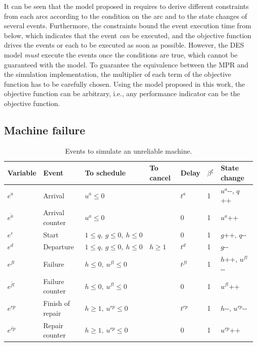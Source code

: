 \documentclass[]{interact}
\theoremstyle{plain}%
\theoremstyle{definition}
\theoremstyle{remark}
\begin{document}
It can be seen that the model proposed in \cite{chan2008optimization} requires to derive different constraints from each arcs according to the condition on the arc and to the state changes of several events. Furthermore, the constraints bound the event execution time from below, which indicates that the event \textit{can} be executed, and the objective function drives the events or each to be executed as soon as possible. However, the DES model \textit{must} execute the events once the conditions are true, which cannot be guaranteed with the model. To guarantee the equivalence between the MPR  and the simulation implementation, the multiplier of each term of the objective function has to be carefully chosen. Using the model proposed in this work, the objective function can be arbitrary, i.e., any performance indicator can be the objective function.

\subsection{Machine failure}
\begin{table}[h]
	\begin{tabular}{|lllllll|}\hline
		Variable&Event & To schedule & To cancel &Delay&$\beta^{\xi}$& State change\\\hline
		$e^{a}$&Arrival&$u^a\le 0$&&$t^{a}$&1&$u^a${\small-}{\small-},  $q${\footnotesize++}\\\hline
		$e^{\tilde{a}}$ & Arrival counter&$u^a\le 0$&&0&1& $u^a${\footnotesize++} \\\hline
		$e^{r}$&Start&$1\le q,\ g\le 0,\ h\le 0$&&0&1&$g${\footnotesize++}, $q${\small-}{\small-}\\\hline
		$e^{d}$&Departure&$1\le q,\ g\le 0,\ h\le 0$&$h\ge 1$&$t^{d}$&1&$g${\small-}{\small-}\\\hline
		$e^{fl}$&Failure& $h\le 0,\ u^{fl}\le 0$&&$t^{fl}$&1&$h${\footnotesize++}, $u^{fl}${\small-}{\small-} \\\hline
		$e^{\tilde{fl}}$&Failure counter& $h\le 0,\ u^{fl}\le 0$&&0&1&$u^{fl}${\footnotesize++} \\\hline
		$e^{rp}$&Finish of repair& $h\ge 1,\ u^{rp}\le 0$&&$t^{rp}$&1&$h${\small-}{\small-}, $u^{rp}${\small-}{\small-}\\\hline
		$e^{\tilde{rp}}$&Repair counter& $h\ge 1,\ u^{rp}\le 0$&&0&1&$u^{rp}${\footnotesize++} \\\hline
	\end{tabular}
	\caption{Events to simulate an unreliable machine.}
	\label{tab:failure}
\end{table}
\end{document}
